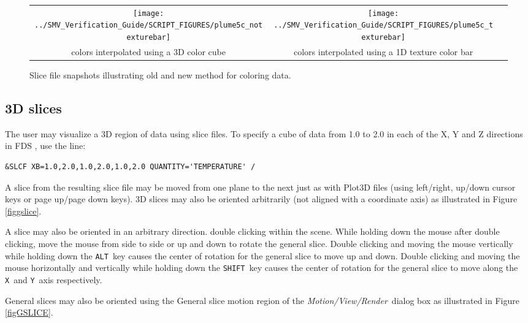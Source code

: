 \documentclass[11pt,twoside]{book}
\begin{document}
\begin{figure}[\figoptions]
\begin{center}
\begin{tabular}{ccc}
\texttt{[image: ../SMV\_Verification\_Guide/SCRIPT\_FIGURES/plume5c\_notexturebar]}&
\texttt{[image: ../SMV\_Verification\_Guide/SCRIPT\_FIGURES/plume5c\_texturebar]}\\
colors interpolated using a 3D color cube&colors interpolated using a 1D texture color bar\\
\end{tabular}
\caption [Slice file snapshots illustrating old and new method for
coloring data.] {Slice file snapshots illustrating old and new
method for coloring data.}
\label{fignewslice}%
\end{center}
\end{figure}

\subsection{3D slices}
The user may visualize a 3D region of data using slice files.
To specify a cube of data from 1.0 to 2.0 in each
of the X, Y and Z directions in FDS , use the line:
\begin{lstlisting}
&SLCF XB=1.0,2.0,1.0,2.0,1.0,2.0 QUANTITY='TEMPERATURE' /
\end{lstlisting}

A slice from the resulting slice file
may be moved from one plane to the next just as with Plot3D
files (using left/right, up/down cursor keys or page up/page down
keys).  3D slices may also be oriented arbitrarily (not aligned with a coordinate
axis) as illustrated in Figure \ref{figgslice}.

A slice may also be oriented in an arbitrary direction.
double clicking within the scene.  While holding down the mouse after double clicking,
move the mouse from
side to side or up and down to rotate the general slice.  Double clicking and moving
the mouse vertically while holding down the {\tt ALT}\
key causes the center of rotation for the general slice to move up and down.
Double clicking and moving the mouse horizontally and vertically while holding down
the {\tt SHIFT}\ key causes the center of rotation for the general slice to move along
the {\tt X}\ and {\tt Y}\ axis respectively.

General slices may also be oriented using the General slice motion
region of the {\em Motion/View/Render}\ dialog box as illustrated
in Figure \ref{figGSLICE}.
\end{document}
